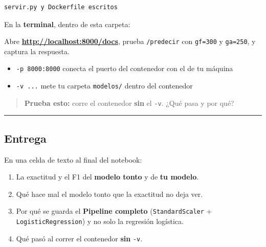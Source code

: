 \documentclass[
]{article}
\newenvironment{Shaded}{}{}
\newcommand{\AttributeTok}[1]{\textcolor[rgb]{0.49,0.56,0.16}{#1}}
\newcommand{\ExtensionTok}[1]{#1}
\newcommand{\NormalTok}[1]{#1}
\newcommand{\StringTok}[1]{\textcolor[rgb]{0.25,0.44,0.63}{#1}}
\newcommand{\VariableTok}[1]{\textcolor[rgb]{0.10,0.09,0.49}{#1}}
\providecommand{\tightlist}{%
  \setlength{\itemsep}{0pt}\setlength{\parskip}{0pt}}
\begin{document}
\begin{verbatim}
servir.py y Dockerfile escritos
\end{verbatim}

\protect{}\label{e222cd91}
En la \textbf{terminal}, dentro de esta carpeta:

\begin{Shaded}
\end{Shaded}

Abre \textbf{\url{http://localhost:8000/docs}}, prueba
\texttt{/predecir} con \texttt{gf=300} y \texttt{ga=250}, y captura la
respuesta.

\begin{itemize}
\tightlist
\item
  \texttt{-p\ 8000:8000} conecta el puerto del contenedor con el de tu
  máquina
\item
  \texttt{-v\ ...} mete tu carpeta \texttt{modelos/} dentro del
  contenedor
\end{itemize}

\begin{quote}
\textbf{Prueba esto:} corre el contenedor \textbf{sin} el \texttt{-v}.
¿Qué pasa y por qué?
\end{quote}

\protect{}\label{d6d0270a}
\begin{center}\rule{0.5\linewidth}{0.5pt}\end{center}

\subsection{Entrega}\label{entrega}

En una celda de texto al final del notebook:

\begin{enumerate}
\tightlist
\item
  La exactitud y el F1 del \textbf{modelo tonto} y de \textbf{tu
  modelo}.
\item
  Qué hace mal el modelo tonto que la exactitud no deja ver.
\item
  Por qué se guarda el \textbf{Pipeline completo}
  (\texttt{StandardScaler} + \texttt{LogisticRegression}) y no solo la
  regresión logística.
\item
  Qué pasó al correr el contenedor \textbf{sin} \texttt{-v}.
\end{enumerate}
\end{document}
